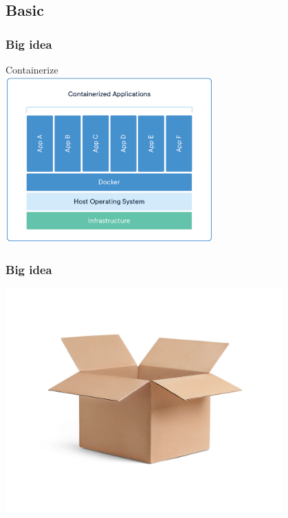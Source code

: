 \documentclass{beamer}
\begin{document}
\subsection{Basic}
\begin{frame}
    \frametitle{Big idea}
    \centering
    Containerize\\
    \includegraphics[width=0.6\textwidth]{docker_what_is_container.png}\\
    \cite{What_is_container}
\end{frame}

\begin{frame}
    \frametitle{Big idea}
    \centering
    \includegraphics[width=0.8\textwidth]{box.jpg}
    \cite{box_graph}
\end{frame}
\end{document}
